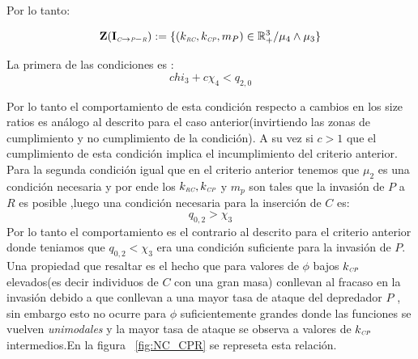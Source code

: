 Por lo tanto:

\begin{equation}
\mathbf{Z(I_{\textit{\tiny C} \to \textit{\tiny P}-\textit{\tiny R}})} := \{ (k_{\textit{\tiny RC}},k_{\textit{\tiny CP}},m_P) \in \mathbb{R}^3_+ / \mu_4 \land \mu_3 \}
\end{equation}

La primera de las condiciones es :
\begin{equation}
  chi_3 + c \chi_4 < q_{2,0}
\end{equation}

Por lo tanto el comportamiento de esta condici\'on respecto a cambios en los size ratios es an\'alogo al descrito para el caso anterior(invirtiendo las zonas de cumplimiento y no cumplimiento de la condici\'on). A su vez si $c>1$ que el cumplimiento de esta condici\'on implica el incumplimiento del criterio anterior.\\
Para la segunda condici\'on igual que en el criterio anterior tenemos que $\mu_2$ es una condici\'on necesaria y por ende los $k_{\textit{\tiny RC}}, k_{\textit{\tiny CP}}$ y $m_p$ son tales que la invasi\'on de $P$ a $R$ es posible ,luego una condici\'on necesaria para la inserci\'on de $C$ es:
\begin{equation}
  q_{0,2} > \chi_3
\end{equation}
Por lo tanto el comportamiento es el contrario al descrito para el criterio anterior donde teniamos que $q_{0,2} < \chi_3$ era una condici\'on suficiente para la invasi\'on de $P$. Una propiedad que resaltar es el hecho que para valores de $\phi$ bajos $k_{\textit{\tiny CP}}$ elevados(es decir individuos de $C$ con una gran masa) conllevan al fracaso en la invasi\'on debido a que conllevan a una mayor tasa de ataque del depredador $P$ , sin embargo esto no ocurre para $\phi$ suficientemente grandes
 donde las funciones se vuelven \emph{unimodales} y la mayor tasa de ataque se observa a valores de $k_{\textit{\tiny CP}}$ intermedios.En la figura ~\ref{fig:NC_CPR} se represeta esta relaci\'on. \\



